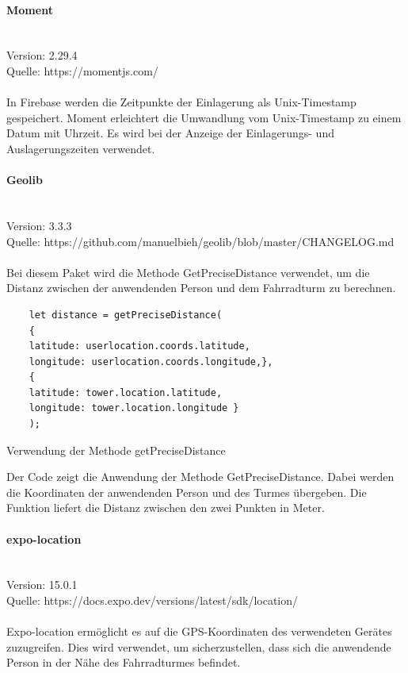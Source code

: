 \paragraph{Moment}\mbox{}\\
Version: 2.29.4\\ Quelle: https://momentjs.com/\\ \\
In Firebase werden die Zeitpunkte der Einlagerung als \Gls{Unix-Timestamp} gespeichert. Moment erleichtert die Umwandlung vom \Gls{Unix-Timestamp} zu einem Datum mit Uhrzeit. Es wird bei der Anzeige der Einlagerungs- und Auslagerungszeiten verwendet. \\

\paragraph{Geolib}\mbox{}\\
Version: 3.3.3\\ Quelle: https://github.com/manuelbieh/geolib/blob/master/CHANGELOG.md\\ \\
Bei diesem Paket wird die Methode GetPreciseDistance verwendet, um die Distanz zwischen der anwendenden Person und dem Fahrradturm zu berechnen. \\
\begin{listing}[H]
  \begin{verbatim}
    let distance = getPreciseDistance(
    {
    latitude: userlocation.coords.latitude,
    longitude: userlocation.coords.longitude,},
    { 
    latitude: tower.location.latitude, 
    longitude: tower.location.longitude }
    );
\end{verbatim}
  \caption{Verwendung der Methode getPreciseDistance}
  \label{lst:getprecisedistance}
\end{listing}
Der Code zeigt die Anwendung der Methode GetPreciseDistance. Dabei werden die Koordinaten der anwendenden Person und des Turmes übergeben. Die Funktion liefert die Distanz zwischen den zwei Punkten in Meter.

\paragraph{expo-location}\mbox{}\\
Version: 15.0.1\\
Quelle: https://docs.expo.dev/versions/latest/sdk/location/ \\ \\
Expo-location ermöglicht es auf die GPS-Koordinaten des verwendeten Gerätes zuzugreifen. Dies wird verwendet, um sicherzustellen, dass sich die anwendende Person in der Nähe des Fahrradturmes befindet. \\


